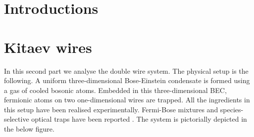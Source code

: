 \documentclass[11pt, twoside]{Thesis}
\begin{document}




\fancyhead[LE,RO]{\thepage}
\tableofcontents %




\mainmatter %

\pagestyle{fancy} %
\fancyhead[LE,RO]{\thepage}



\part{Introductions}
\newpage


 

\part{Kitaev wires}
\fancyhead[LE,RO]{\thepage}
In this second part we analyse the double wire system. The physical setup is the following. A uniform three-dimensional Bose-Einstein condensate is formed using a gas of cooled bosonic atoms. Embedded in this three-dimensional BEC, fermionic atoms on two one-dimensional wires are trapped. All the ingredients in this setup have been realised experimentally. Fermi-Bose mixtures and species-selective optical traps have been reported \cite{Lamporesi.MixedDimensions, McKay.MixedTrapping, Jotzu.SpeciesSelectiveTrap}. The system is pictorially depicted in the below figure.
\end{document}

